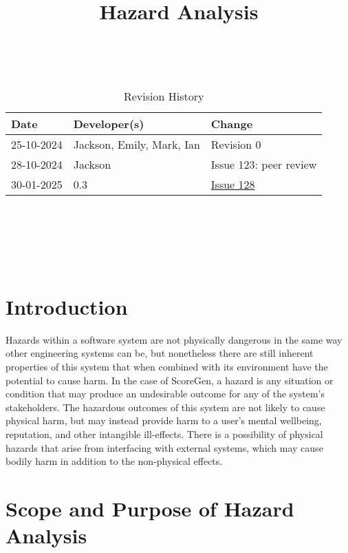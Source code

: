 \documentclass{article}
\title{Hazard Analysis\\\progname}
\author{\authname}
\date{}
\begin{document}
\maketitle
\thispagestyle{empty}

~\newpage


\begin{table}[hp]
\caption{Revision History} \label{TblRevisionHistory}
\begin{tabularx}{\textwidth}{llX}
\toprule
\textbf{Date} & \textbf{Developer(s)} & \textbf{Change}\\
\midrule
25-10-2024 & Jackson, Emily, Mark, Ian & Revision 0\\
28-10-2024 & Jackson & Issue 123: peer review\\
30-01-2025 & 0.3 & \href{https://github.com/emilyperica/ScoreGen/issues/128}{Issue 128}\\
\bottomrule
\end{tabularx}
\end{table}

~\newpage

\tableofcontents

~\newpage

\listoftables

~\newpage


\section{Introduction}

Hazards within a software system are not physically dangerous in the same way other engineering systems can be, 
but nonetheless there are still inherent properties of this system that when combined with its environment have 
the potential to cause harm. In the case of ScoreGen, a hazard is any situation or condition that may produce an 
undesirable outcome for any of the system’s stakeholders. The hazardous outcomes of this system are not likely to 
cause physical harm, but may instead provide harm to a user’s mental wellbeing, reputation, and other intangible 
ill-effects. There is a possibility of physical hazards that arise from interfacing with external systems, which 
may cause bodily harm in addition to the non-physical effects.

\section{Scope and Purpose of Hazard Analysis}
\end{document}
